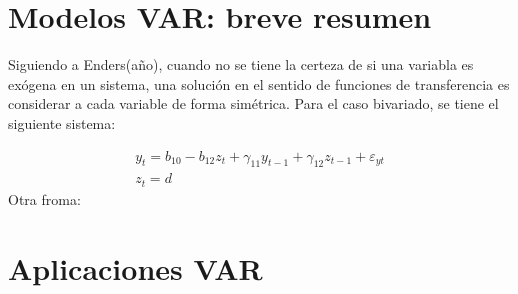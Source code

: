 \documentclass{article}
\begin{document}
\section{Modelos VAR: breve resumen}
Siguiendo a Enders(año), cuando no se tiene la certeza de si una variabla es exógena en un sistema, 
una solución en el sentido de funciones de transferencia es considerar a cada variable de forma simétrica.
Para el caso bivariado, se tiene el siguiente sistema:

\begin{eqnarray}
    y_{t}=b_{10}-b_{12}z_t+\gamma _{11}y_{t-1}+\gamma _{12}z_{t-1}+\varepsilon _{yt} \\
    z_{t}=d
\end{eqnarray}
Otra froma: 


\section{Aplicaciones VAR}

\end{document}
